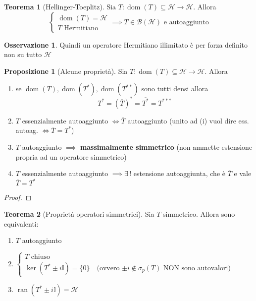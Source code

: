 \documentclass[a4paper,10pt]{article}
\theoremstyle{definition}
\DeclareMathOperator*{\ran}{ran}
\DeclareMathOperator*{\dom}{dom} %
\newcommand{\hil}{\mathcal{H}} %
\theoremstyle{indentdefinition}
\theoremstyle{indenttheorem}
\newtheorem{thm}{Teorema}
\newtheorem{prop}{Proposizione}
\theoremstyle{myremark}
\newtheorem*{rem*}{Osservazione}
\theoremstyle{indentgeneral}
\newenvironment{myboxed} 
{\noindent\begin{lrbox}{\mybox}\begin{minipage}{\textwidth}}
{\end{minipage}\end{lrbox}\fbox{\usebox{\mybox}}}
\begin{document}
\begin{thm}[Hellinger-Toeplitz]
    Sia $T:\dom(T)\subseteq\hil\to \hil$. Allora
    $$\begin{cases}
        \dom(T)=\hil\\
        T \text{ Hermitiano}
    \end{cases}\implies T\in\mathcal{B}(\hil) \text{ e autoaggiunto}$$
\end{thm}

\begin{rem*}
    Quindi un operatore Hermitiano illimitato è per forza definito non su tutto $\hil$
\end{rem*}

\begin{myboxed}
    \begin{prop}[Alcune proprietà]
        Sia $T:\dom(T)\subseteq\hil\to \hil$. Allora
        \begin{enumerate}
            \item se $\dom(T),\dom(T^*),\dom(T^{**})$ sono tutti densi allora $$T^*=(\overline{T})^*=\overline{T^*}=T^{***}$$
            \item $T$ essenzialmente autoaggiunto $\iff\overline{T}$ autoaggiunto (unito ad  (i) vuol dire ess. autoag. $\iff \overline{T}=T^*$)\\
            \item $T$ autoaggiunto $\implies$ \textbf{massimalmente simmetrico} (non ammette estensione propria ad un operatore simmetrico)
            \item $T$ essenzialmente autoaggiunto $\implies\exists\,!$ estensione autoaggiunta, che è $\overline{T}$ e vale $\overline{T}=T^*$
        \end{enumerate}
    \end{prop}
\end{myboxed}

\begin{proof}
    \todo{}
\end{proof}

\begin{myboxed}
\begin{thm}[Proprietà operatori simmetrici]
    Sia $T$ simmetrico. Allora sono equivalenti:
    \begin{enumerate}
        \item $T$ autoaggiunto
        \item $\begin{cases}
            T \text{ chiuso}\\
            \ker(T^*\pm i\mathbb{I})=\{0\} \quad \text{(ovvero $\pm i\notin\sigma_p(T)$ NON sono autovalori)}
        \end{cases}$
        \item $\ran(T^*\pm i\mathbb{I})=\hil$
    \end{enumerate}
\end{thm}
\end{myboxed}
\end{document}
